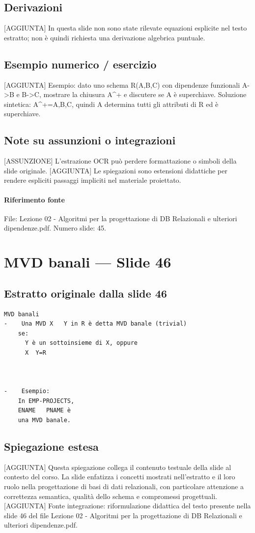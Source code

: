 \documentclass[11pt]{article}
\begin{document}
\subsection*{Derivazioni}
[AGGIUNTA] In questa slide non sono state rilevate equazioni esplicite nel testo estratto; non è quindi richiesta una derivazione algebrica puntuale.
\subsection*{Esempio numerico / esercizio}
[AGGIUNTA] Esempio: dato uno schema R(A,B,C) con dipendenze funzionali A->B e B->C, mostrare la chiusura A^+ e discutere se A è superchiave. Soluzione sintetica: A^+={A,B,C}, quindi A determina tutti gli attributi di R ed è superchiave.
\subsection*{Note su assunzioni o integrazioni}
[ASSUNZIONE] L'estrazione OCR può perdere formattazione o simboli della slide originale.
[AGGIUNTA] Le spiegazioni sono estensioni didattiche per rendere espliciti passaggi impliciti nel materiale proiettato.
\paragraph{Riferimento fonte} File: Lezione 02 - Algoritmi per la progettazione di DB Relazionali e ulteriori dipendenze.pdf. Numero slide: 45.
\section{MVD banali --- Slide 46}
\subsection*{Estratto originale dalla slide 46}
\begin{lstlisting}
MVD banali
-    Una MVD X   Y in R è detta MVD banale (trivial)
    se:
      Y è un sottoinsieme di X, oppure
      X  Y=R



-    Esempio:
    In EMP-PROJECTS,
    ENAME   PNAME è
    una MVD banale.
\end{lstlisting}
\subsection*{Spiegazione estesa}
[AGGIUNTA] Questa spiegazione collega il contenuto testuale della slide al contesto del corso. La slide enfatizza i concetti mostrati nell'estratto e il loro ruolo nella progettazione di basi di dati relazionali, con particolare attenzione a correttezza semantica, qualità dello schema e compromessi progettuali.
[AGGIUNTA] Fonte integrazione: riformulazione didattica del testo presente nella slide 46 del file Lezione 02 - Algoritmi per la progettazione di DB Relazionali e ulteriori dipendenze.pdf.
\end{document}
